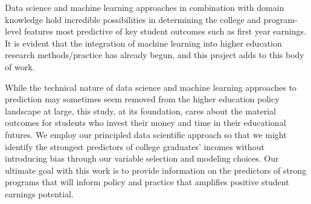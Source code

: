 \documentclass[a4paper, 12pt]{article}
\begin{document}
Data science and machine learning approaches in combination with
domain knowledge hold incredible possibilities in determining the
college and program-level features most predictive of key student
outcomes such as first year earnings. It is evident that the
integration of machine learning into higher education research
methods/practice has already begun, and this project adds to this body
of work.

While the technical nature of data science and machine learning
approaches to prediction may sometimes seem removed from the higher
education policy landscape at large, this study, at its foundation,
cares about the material outcomes for students who invest their money
and time in their educational futures. We employ our principled data
scientific approach so that we might identify the strongest predictors
of college graduates' incomes without introducing bias through our
variable selection and modeling choices. Our ultimate goal with this
work is to provide information on the predictors of strong programs
that will inform policy and practice that amplifies positive student
earnings potential.

\pagebreak
{}
\setlength{} 
\printbibliography
\end{document}
